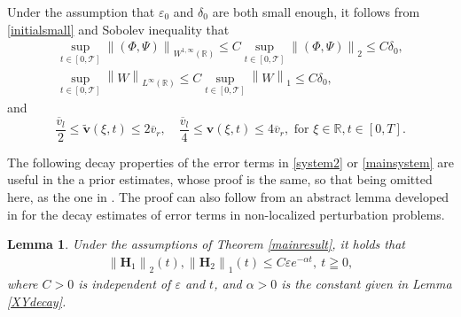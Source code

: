 \documentclass[12pt,reqno]{amsart}
\numberwithin{equation}{section}
\newcommand{\norm}[1]{\left\lVert #1 \right\rVert}
\def\R{\mathbb{R}}
\def\T{\mathcal{T}}
\def\avl{\overline{v}_l}
\def\avr{\overline{v}_r}
\newtheorem{lemma}[theorem]{Lemma}
\begin{document}
Under the assumption that $\varepsilon_0$ and $\delta_0$ are both small enough, it follows from \eqref{initialsmall} and Sobolev inequality that 
\begin{equation}\label{small1}
	\begin{aligned}
		\mathop{sup}\limits_{t \in [0,\T]}\norm{(\Phi,\Psi)}_{W^{1,\infty}(\R)}\leq C\mathop{sup}\limits_{t \in [0,\T]}\norm{(\Phi,\Psi)}_2\leq C\delta_0,\\
		\mathop{sup}\limits_{t \in [0,\T]}\norm{W}_{L^{\infty}(\R)}\leq C\mathop{sup}\limits_{t \in [0,\T]}\norm{W}_1\leq C\delta_0,
	\end{aligned}
\end{equation}
and 
\begin{equation}\label{v-bdd}
	\frac{\avl}{2}\leq \mathbf{\tilde{v}}(\xi,t)\leq 2\avr, \quad \frac{\avl}{4}\leq \mathbf{v}(\xi,t)\leq 4\avr,\text{ for }\xi \in \R, t\in[0,T].
\end{equation}


The following decay properties of the
error terms in \eqref{system2} or \eqref{mainsystem} are useful in the a prior estimates, whose proof is the same, so that being omitted here, as the one in \cite{HuangYuanCMP}. The proof can also follow from an abstract lemma developed in \cite{MeiYuan2025} for the decay estimates of error terms in non-localized perturbation problems.
\begin{lemma}\label{decay-error}
	Under the assumptions of Theorem \ref{mainresult}, it holds that
	\begin{align*}
		\norm{\mathbf{H}_1}_2(t),\norm{\mathbf{H}_2}_1(t)\leq C\varepsilon e^{-\alpha t},~t\geqq 0,
	\end{align*}
	where $C>0$ is independent of $\varepsilon$ and $t$, and $\alpha>0$ is the constant given in Lemma \ref{XYdecay}.
\end{lemma}
\end{document}
